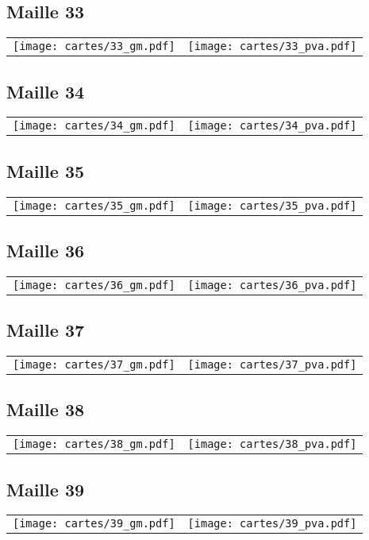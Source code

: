 \subsection{Maille 33}
\begin{tabular}{ll}
\texttt{[image: cartes/33\_gm.pdf]}
&
\texttt{[image: cartes/33\_pva.pdf]}
\end{tabular}
\newpage
\subsection{Maille 34}
\begin{tabular}{ll}
\texttt{[image: cartes/34\_gm.pdf]}
&
\texttt{[image: cartes/34\_pva.pdf]}
\end{tabular}
\newpage
\subsection{Maille 35}
\begin{tabular}{ll}
\texttt{[image: cartes/35\_gm.pdf]}
&
\texttt{[image: cartes/35\_pva.pdf]}
\end{tabular}
\newpage
\subsection{Maille 36}
\begin{tabular}{ll}
\texttt{[image: cartes/36\_gm.pdf]}
&
\texttt{[image: cartes/36\_pva.pdf]}
\end{tabular}
\newpage
\subsection{Maille 37}
\begin{tabular}{ll}
\texttt{[image: cartes/37\_gm.pdf]}
&
\texttt{[image: cartes/37\_pva.pdf]}
\end{tabular}
\newpage
\subsection{Maille 38}
\begin{tabular}{ll}
\texttt{[image: cartes/38\_gm.pdf]}
&
\texttt{[image: cartes/38\_pva.pdf]}
\end{tabular}
\newpage
\subsection{Maille 39}
\begin{tabular}{ll}
\texttt{[image: cartes/39\_gm.pdf]}
&
\texttt{[image: cartes/39\_pva.pdf]}
\end{tabular}
\newpage
